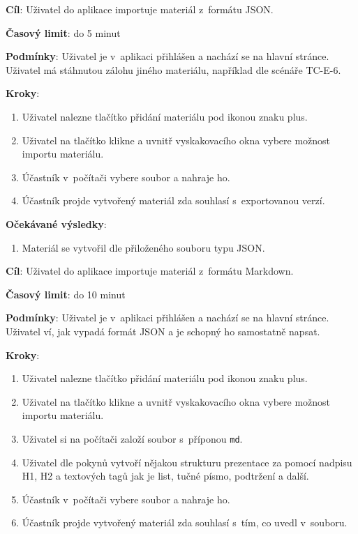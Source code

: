 \vspace{1em}

\textbf{Cíl}: Uživatel do aplikace importuje materiál z~formátu JSON.

\textbf{Časový limit}: do 5 minut

\textbf{Podmínky}:  Uživatel je v~aplikaci přihlášen a nachází se na hlavní stránce. Uživatel má stáhnutou zálohu jiného materiálu, například dle scénáře TC-E-6.

\textbf{Kroky}:

\begin{enumerate}[leftmargin=1.4cm]
    \item Uživatel nalezne tlačítko přidání materiálu pod ikonou znaku plus.
    \item Uživatel na tlačítko klikne a uvnitř vyskakovacího okna vybere možnost importu materiálu.
    \item Účastník v~počítači vybere soubor a nahraje ho.
    \item Účastník projde vytvořený materiál zda souhlasí s~exportovanou verzí.
\end{enumerate}

\textbf{Očekávané výsledky}:

\begin{enumerate}[leftmargin=1.4cm]
    \item Materiál se vytvořil dle přiloženého souboru typu JSON.
\end{enumerate}






\vspace{1em}

\textbf{Cíl}: Uživatel do aplikace importuje materiál z~formátu Markdown.

\textbf{Časový limit}: do 10 minut

\textbf{Podmínky}:  Uživatel je v~aplikaci přihlášen a nachází se na hlavní stránce. Uživatel ví, jak vypadá formát JSON a je schopný ho samostatně napsat.

\textbf{Kroky}:

\begin{enumerate}[leftmargin=1.4cm]
    \item Uživatel nalezne tlačítko přidání materiálu pod ikonou znaku plus.
    \item Uživatel na tlačítko klikne a uvnitř vyskakovacího okna vybere možnost importu materiálu.
    \item Uživatel si na počítači založí soubor s~příponou \verb|md|.
    \item Uživatel dle pokynů vytvoří nějakou strukturu prezentace za pomocí nadpisu H1, H2 a textových tagů jak je list, tučné písmo, podtržení a další.
    \item Účastník v~počítači vybere soubor a nahraje ho.
    \item Účastník projde vytvořený materiál zda souhlasí s~tím, co uvedl v~souboru.
\end{enumerate}

